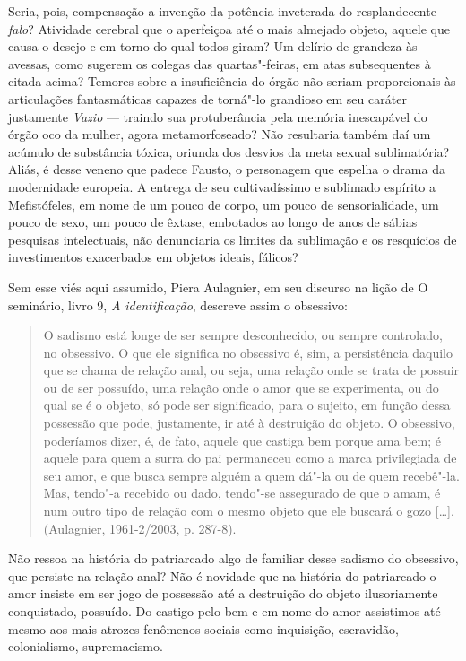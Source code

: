 Seria, pois, compensação a invenção da potência inveterada do
resplandecente \emph{falo}? Atividade cerebral que o aperfeiçoa até o
mais almejado objeto, aquele que causa o desejo e em torno do qual todos
giram? Um delírio de grandeza às avessas, como sugerem os colegas das
quartas"-feiras, em atas subsequentes à citada acima? Temores sobre a
insuficiência do órgão não seriam proporcionais às articulações
fantasmáticas capazes de torná"-lo grandioso em seu caráter justamente
\emph{Vazio} --- traindo sua protuberância pela memória inescapável do
órgão oco da mulher, agora metamorfoseado? Não resultaria também daí um
acúmulo de substância tóxica, oriunda dos desvios da meta sexual
sublimatória? Aliás, é desse veneno que padece Fausto, o personagem que
espelha o drama da modernidade europeia. A entrega de seu cultivadíssimo
e sublimado espírito a Mefistófeles, em nome de um pouco de corpo, um
pouco de sensorialidade, um pouco de sexo, um pouco de êxtase, embotados
ao longo de anos de sábias pesquisas intelectuais, não denunciaria os
limites da sublimação e os resquícios de investimentos exacerbados em
objetos ideais, fálicos?

Sem esse viés aqui assumido, Piera Aulagnier, em seu discurso na lição
 de O seminário, livro 9, \emph{A identificação}, descreve assim o
obsessivo:

\begin{quote}
O sadismo está longe de ser sempre desconhecido, ou sempre controlado,
no obsessivo. O que ele significa no obsessivo é, sim, a persistência
daquilo que se chama de relação anal, ou seja, uma relação onde se trata
de possuir ou de ser possuído, uma relação onde o amor que se
experimenta, ou do qual se é o objeto, só pode ser significado, para o
sujeito, em função dessa possessão que pode, justamente, ir até à
destruição do objeto. O obsessivo, poderíamos dizer, é, de fato, aquele
que castiga bem porque ama bem; é aquele para quem a surra do pai
permaneceu como a marca privilegiada de seu amor, e que busca sempre
alguém a quem dá"-la ou de quem recebê"-la. Mas, tendo"-a recebido ou dado,
tendo"-se assegurado de que o amam, é num outro tipo de relação com o
mesmo objeto que ele buscará o gozo {[}\ldots{}{]}. (Aulagnier, 1961-2/2003,
p. 287-8).
\end{quote}

Não ressoa na história do patriarcado algo de familiar desse sadismo do
obsessivo, que persiste na relação anal? Não é novidade que na história
do patriarcado o amor insiste em ser jogo de possessão até a destruição
do objeto ilusoriamente conquistado, possuído. Do castigo pelo bem e em
nome do amor assistimos até mesmo aos mais atrozes fenômenos sociais
como inquisição, escravidão, colonialismo, supremacismo.

